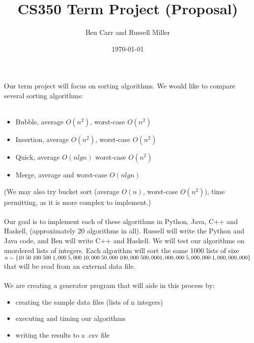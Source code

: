 \documentclass[12pt]{amsart}
\title{CS350 Term Project (Proposal)}
\author{Ben Carr and Russell Miller}
\date{\today} %
\begin{document}
\maketitle


\section*{}
\subsection*{}


Our term project will focus on sorting algorithms. We would like to compare several sorting algorithms: \\ \\
\begin{itemize}
\item Bubble, average  $O(n^2)$, worst-case $O(n^2)$\\
\item Insertion, average $O(n^2)$, worst-case $O(n^2)$\\
\item Quick, average $O(n lg n)$ worst-case $O(n^2)$\\
\item Merge, average and worst-case $O(n lg n)$\\
\end{itemize}
(We may also try bucket sort (average $O(n)$, worst-case $O(n^2)$), time permitting, as it is more complex to implement.)\\ \\
Our goal is to implement each of these algorithms in Python, Java, C++ and Haskell, (approximately 20 algorithms in all). Russell will write the Python and Java code, and Ben will write C++ and Haskell. We will test our algorithms on unordered lists of integers. Each algorithm will sort the same 1000 lists of size \\
$n = \{10 \; 50 \; 100 \;500\; 1,000\; 5,000\; 10,000\; 50,000 \;100,000\; 500,000 \\1,000,000\; 5,000,000 \;1,000,000,000\}$ that will be read from an external data file.\\ \\
We are creating a generator program that will aide in this process by:\\
\begin{itemize}
\item creating the sample data files (lists of n integers)
\item executing and timing our algorithms 
\item writing the results to a .csv file\\
\end{itemize}
\end{document}

